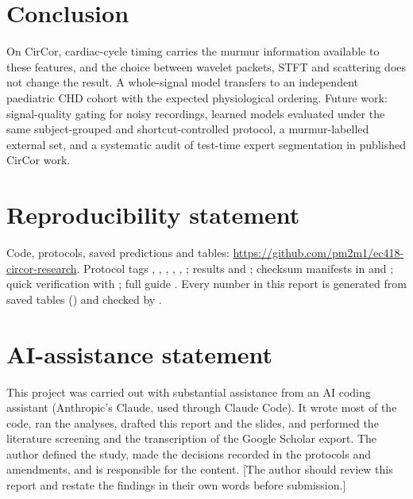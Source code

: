 \documentclass[11pt,a4paper]{article}
\newcommand{\todo}[1]{{\color{gray}[#1]}}
\begin{document}
\section{Conclusion}
On CirCor, cardiac-cycle timing carries the murmur information available to these features, and the choice between
wavelet packets, STFT and scattering does not change the result. A whole-signal model transfers to an independent
paediatric CHD cohort with the expected physiological ordering. Future work: signal-quality gating for noisy recordings,
learned models evaluated under the same subject-grouped and shortcut-controlled protocol, a murmur-labelled external set,
and a systematic audit of test-time expert segmentation in published CirCor work.

\section*{Reproducibility statement}
{\sloppy Code, protocols, saved predictions and tables: \url{https://github.com/pm2m1/ec418-circor-research}. Protocol tags
, , , , ,
; results  and ; checksum manifests in
 and ; quick verification with
; full guide . Every number in this report is
generated from saved tables () and checked by .\par}

\section*{AI-assistance statement}
This project was carried out with substantial assistance from an AI coding assistant (Anthropic's Claude, used through
Claude Code). It wrote most of the code, ran the analyses, drafted this report and the slides, and performed the
literature screening and the transcription of the Google Scholar export. The author defined the study, made the decisions
recorded in the protocols and amendments, and is responsible for the content. \todo{The author should review this report
and restate the findings in their own words before submission.}
\end{document}
